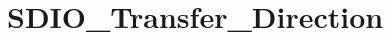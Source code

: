 \hypertarget{group___s_d_i_o___transfer___direction}{\section{S\-D\-I\-O\-\_\-\-Transfer\-\_\-\-Direction}
\label{group___s_d_i_o___transfer___direction}
}
